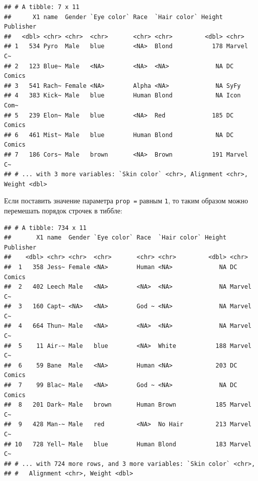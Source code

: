 \documentclass[]{book}
\newenvironment{Shaded}{\begin{snugshade}}{\end{snugshade}}
\newcommand{\KeywordTok}[1]{\textcolor[rgb]{0.13,0.29,0.53}{\textbf{#1}}}
\newcommand{\DataTypeTok}[1]{\textcolor[rgb]{0.13,0.29,0.53}{#1}}
\newcommand{\DecValTok}[1]{\textcolor[rgb]{0.00,0.00,0.81}{#1}}
\newcommand{\StringTok}[1]{\textcolor[rgb]{0.31,0.60,0.02}{#1}}
\newcommand{\OperatorTok}[1]{\textcolor[rgb]{0.81,0.36,0.00}{\textbf{#1}}}
\newcommand{\NormalTok}[1]{#1}
\begin{document}
\begin{verbatim}
## # A tibble: 7 x 11
##      X1 name  Gender `Eye color` Race  `Hair color` Height Publisher
##   <dbl> <chr> <chr>  <chr>       <chr> <chr>         <dbl> <chr>    
## 1   534 Pyro  Male   blue        <NA>  Blond           178 Marvel C~
## 2   123 Blue~ Male   <NA>        <NA>  <NA>             NA DC Comics
## 3   541 Rach~ Female <NA>        Alpha <NA>             NA SyFy     
## 4   383 Kick~ Male   blue        Human Blond            NA Icon Com~
## 5   239 Elon~ Male   blue        <NA>  Red             185 DC Comics
## 6   461 Mist~ Male   blue        Human Blond            NA DC Comics
## 7   186 Cors~ Male   brown       <NA>  Brown           191 Marvel C~
## # ... with 3 more variables: `Skin color` <chr>, Alignment <chr>, Weight <dbl>
\end{verbatim}

Если поставить значение параметра \texttt{prop\ =} равным \texttt{1}, то
таким образом можно перемешать порядок строчек в тиббле:

\begin{Shaded}
\end{Shaded}

\begin{verbatim}
## # A tibble: 734 x 11
##       X1 name  Gender `Eye color` Race  `Hair color` Height Publisher
##    <dbl> <chr> <chr>  <chr>       <chr> <chr>         <dbl> <chr>    
##  1   358 Jess~ Female <NA>        Human <NA>             NA DC Comics
##  2   402 Leech Male   <NA>        <NA>  <NA>             NA Marvel C~
##  3   160 Capt~ <NA>   <NA>        God ~ <NA>             NA Marvel C~
##  4   664 Thun~ Male   <NA>        <NA>  <NA>             NA Marvel C~
##  5    11 Air-~ Male   blue        <NA>  White           188 Marvel C~
##  6    59 Bane  Male   <NA>        Human <NA>            203 DC Comics
##  7    99 Blac~ Male   <NA>        God ~ <NA>             NA DC Comics
##  8   201 Dark~ Male   brown       Human Brown           185 Marvel C~
##  9   428 Man-~ Male   red         <NA>  No Hair         213 Marvel C~
## 10   728 Yell~ Male   blue        Human Blond           183 Marvel C~
## # ... with 724 more rows, and 3 more variables: `Skin color` <chr>,
## #   Alignment <chr>, Weight <dbl>
\end{verbatim}
\end{document}

